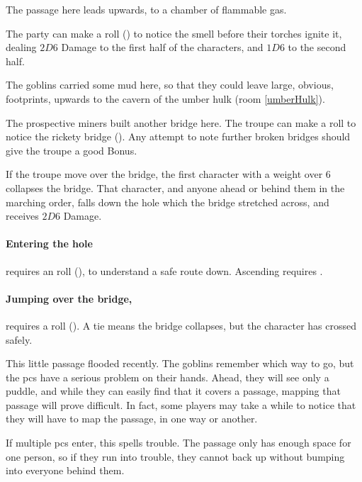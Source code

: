 \begin{multicols}{2}

The passage here leads upwards, to a chamber of flammable gas.

The party can make a  roll (\tn[13]) to notice the smell before their torches ignite it, dealing $2D6$ Damage to the first half of the characters, and $1D6$ to the second half.


The goblins carried some mud here, so that they could leave large, obvious, footprints, upwards to the cavern of the umber hulk (room \ref{umberHulk}).



The prospective miners built another bridge here.
The troupe can make a  roll to notice the rickety bridge (\tn[10]).
Any attempt to note further broken bridges should give the troupe a good Bonus.

If the troupe move over the bridge, the first character with a \gls{weight} over 6 collapses the bridge.
That character, and anyone ahead or behind them in the marching order, falls down the hole which the bridge stretched across, and receives $2D6$ Damage.

\paragraph{Entering the hole}
requires an  roll (\tn[10]), to understand a safe route down.
Ascending requires \tn[12].

\paragraph{Jumping over the bridge,}
requires a  roll (\tn[9]).
A tie means the bridge collapses, but the character has crossed safely.


This little passage flooded recently.
The goblins remember which way to go, but the \glspl{pc} have a serious problem on their hands.
Ahead, they will see only a puddle, and while they can easily find that it covers a passage, mapping that passage will prove difficult.
In fact, some players may take a while to notice that they will have to map the passage, in one way or another.

If multiple \glspl{pc} enter, this spells trouble.
The passage only has enough space for one person, so if they run into trouble, they cannot back up without bumping into everyone behind them.


\end{multicols}

